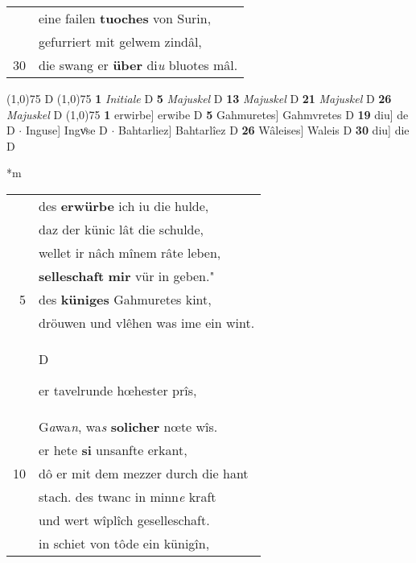 \documentclass[8pt,a4paper,notitlepage]{article}
\begin{document}
\begin{table}[ht]
\begin{minipage}[t]{0.5\linewidth}
\begin{tabular}{rl}
 & eine failen \textbf{tuoches} von Surin,\\ 
 & gefurriert mit gelwem zindâl,\\ 
30 & die swang er \textbf{über} di\textit{u} bluotes mâl.\\ 
\end{tabular}
\scriptsize
\line(1,0){75} \newline
D \newline
\line(1,0){75} \newline
\textbf{1} \textit{Initiale} D  \textbf{5} \textit{Majuskel} D  \textbf{13} \textit{Majuskel} D  \textbf{21} \textit{Majuskel} D  \textbf{26} \textit{Majuskel} D  \newline
\line(1,0){75} \newline
\textbf{1} erwirbe] erwibe D \textbf{5} Gahmuretes] Gahmvretes D \textbf{19} diu] de D  $\cdot$ Inguse] Ingvͦse D  $\cdot$ Bahtarliez] Bahtarlîez D \textbf{26} Wâleises] Waleis D \textbf{30} diu] die D \newline
\end{minipage}
\hspace{0.5cm}
\begin{minipage}[t]{0.5\linewidth}
\small
\begin{center}*m
\end{center}
\begin{tabular}{rl}
 & des \textbf{erwürbe} ich iu die hulde,\\ 
 & daz der künic lât die schulde,\\ 
 & wellet ir nâch mînem râte leben,\\ 
 & \textbf{selleschaft} \textbf{mir} vür in geben."\\ 
5 & des \textbf{küniges} Gahmuretes kint,\\ 
 & dröuwen und vlêhen was ime ein wint.\\ 
 & \begin{large}D\end{large}er tavelrunde hœhester prîs,\\ 
 & G\textit{a}wa\textit{n}, wa\textit{s} \textbf{solicher} nœte wîs.\\ 
 & er hete \textbf{si} unsanfte erkant,\\ 
10 & dô er mit dem mezzer durch die hant\\ 
 & stach. des twanc in minn\textit{e} kraft\\ 
 & und wert wîplîch geselleschaft.\\ 
 & in schiet von tôde ein künigîn,\\ 

\end{tabular}
\end{minipage}
\end{table}
\end{document}
